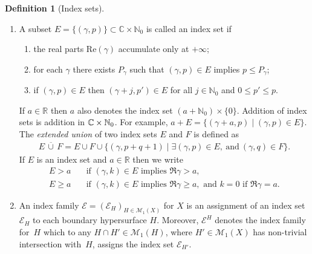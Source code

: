 \documentclass[11pt]{article}
\newcommand{\skpt}{\smallskip}
\numberwithin{equation}{section}
\theoremstyle{plain}
\theoremstyle{definition}
\newtheorem{defn}[Th]{Definition}
\newcommand {\N}{\mathbb{N}}
\newcommand{\R}{{\mathbb{R}}}
\newcommand\calE{{\mathcal E}}
\newcommand\calM{{\mathcal M}}
\begin{document}
\skpt
\begin{defn}[Index sets]
\begin{enumerate}
\item
A subset $E =\{(\gamma,p)\} \subset \mathbb{C}\times \mathbb{N}_{0}$
is called an index set if
\begin{enumerate}
\item
the real parts $\text{Re}(\gamma)$ accumulate only at $+\infty$;
\item
for each $\gamma$ there exists $P_{\gamma}$ such that
$(\gamma, p) \in E$ implies $ p \leq P_{\gamma}$;
\item
if $(\gamma, p) \in E$ then $(\gamma + j, p') \in E$
for all $ j \in \mathbb{N}_{0}$ and $0 \leq p' \leq p$.
\end{enumerate}
If $a\in\R$ then $a$ also denotes the index set $(a+\N_0)\times\{0\}$.
Addition of index sets is addition in $\C\times\N_0$.
For example, $a+E=\{(\gamma+a,p)\mid (\gamma,p)\in E\}$.
The \emph{extended union} of two index sets
$E$ and $F$ is defined as
\begin{align}
\label{extended}
E \,\overline{\cup} \,F = E \cup F \cup \{(\gamma, p + q + 1)\mid \exists (\gamma,p) \in E,\
\mbox{and}\ (\gamma,q) \in F \}.
\end{align}
If $E$ is an index set and $a\in\R$ then we write
\begin{align*}
E>a &\quad\text{if } (\gamma,k)\in E \text{ implies } \Re \gamma>a, \\
E\geq a &\quad\text{if } (\gamma,k)\in E \text{ implies } \Re \gamma\geq a, \text{ and $k=0$ if $\Re \gamma=a$}.
\end{align*}
\item
An index family $\calE = (\calE_H)_{H\in\calM_1(X)}$ for $X$ is an assignment of an index set~$\calE_H$ to each boundary hypersurface $H$.
Moreover, $\calE^H$ denotes the index family for~$H$ which to any $H\cap H'\in\calM_1(H)$, where $H'\in\calM_1(X)$ has non-trivial intersection with~$H$,
assigns the index set $\calE_{H'}$.
\end{enumerate}
\end{defn}
\end{document}
